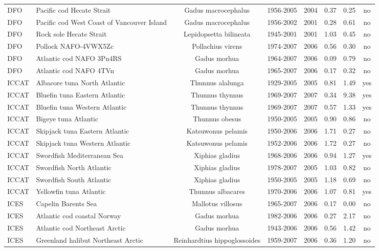 \begin{longtable}{p{6cm}p{3cm}cccccc}
  DFO & Pacific cod Hecate Strait & Gadus macrocephalus & 1956-2005 & 2004 & 0.37 & 0.25 & no \\
  DFO & Pacific cod West Coast of Vancouver Island & Gadus macrocephalus & 1956-2002 & 2001 & 0.28 & 0.61 & no \\
  DFO & Rock sole Hecate Strait & Lepidopsetta bilineata & 1945-2001 & 2001 & 1.03 & 0.45 & no \\
  DFO & Pollock NAFO-4VWX5Zc & Pollachius virens & 1974-2007 & 2006 & 0.56 & 0.30 & no \\
  DFO & Atlantic cod NAFO 3Pn4RS & Gadus morhua & 1964-2007 & 2006 & 0.09 & 0.79 & no \\
  DFO & Atlantic cod NAFO 4TVn & Gadus morhua & 1965-2007 & 2006 & 0.17 & 0.32 & no \\
  ICCAT & Albacore tuna North Atlantic & Thunnus alalunga & 1929-2005 & 2005 & 0.81 & 1.49 & yes \\
  ICCAT & Bluefin tuna Eastern Atlantic & Thunnus thynnus & 1969-2007 & 2007 & 0.34 & 9.38 & yes \\
  ICCAT & Bluefin tuna Western Atlantic & Thunnus thynnus & 1969-2007 & 2007 & 0.57 & 1.33 & yes \\
  ICCAT & Bigeye tuna Atlantic & Thunnus obesus & 1950-2005 & 2005 & 0.90 & 0.86 & no \\
  ICCAT & Skipjack tuna Eastern Atlantic & Katsuwonus pelamis & 1950-2006 & 2006 & 1.71 & 0.27 & no \\
  ICCAT & Skipjack tuna Western Atlantic & Katsuwonus pelamis & 1952-2006 & 2006 & 1.72 & 0.27 & no \\
  ICCAT & Swordfish Mediterranean Sea & Xiphias gladius & 1968-2006 & 2006 & 0.94 & 1.27 & yes \\
  ICCAT & Swordfish North Atlantic & Xiphias gladius & 1978-2007 & 2005 & 1.03 & 0.82 & no \\
  ICCAT & Swordfish South Atlantic & Xiphias gladius & 1950-2005 & 2005 & 1.18 & 0.69 & no \\
  ICCAT & Yellowfin tuna Atlantic & Thunnus albacares & 1970-2006 & 2006 & 1.07 & 0.81 & yes \\
  ICES & Capelin Barents Sea & Mallotus villosus & 1965-2007 & 2006 & 0.17 & 0.00 & no \\
  ICES & Atlantic cod coastal Norway & Gadus morhua & 1982-2006 & 2006 & 0.27 & 2.17 & no \\
  ICES & Atlantic cod Northeast Arctic & Gadus morhua & 1943-2006 & 2006 & 0.56 & 1.42 & no \\
  ICES & Greenland halibut Northeast Arctic & Reinhardtius hippoglossoides & 1959-2007 & 2006 & 0.36 & 1.20 & no \\

\end{longtable}

